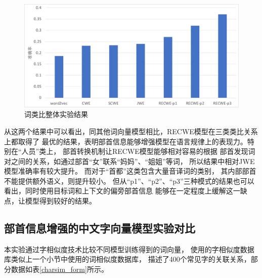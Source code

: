 \begin{figure}[!h]
    \includegraphics[scale=0.5]{picture/word_analogy_result.pdf}
    \caption{词类比整体实验结果}
    \label{word_analogy_all_resutl}
\end{figure}

从这两个结果中可以看出，同其他词向量模型相比，RECWE模型在三类类比关系上都取得了
最优的结果，表明部首信息能够增强模型在语言规律上的表现力。特别在“人员”类上，
部首转换机制让RECWE模型能够相对容易的根据
部首发现词对之间的关系，如通过部首“女”联系“妈妈”、“姐姐”等词，
所以结果中相对JWE模型准确率有较大提升。
而对于“首都”这类包含大量音译词的类别，
其内部部首不能提供额外语义，则提升较小。
但从“p1”、“p2”、“p3”三种模式的结果也可以看出，同时使用目标词和上下文的偏旁部首信息
能够在一定程度上缓解这一缺点，让模型得到较好的结果。

\subsection{部首信息增强的中文字向量模型实验对比}
本实验通过字相似度技术比较不同模型训练得到的词向量，
使用的字相似度数据库类似上一个小节中使用的词相似度数据库，
描述了400个常见字的关联关系，部分数据如表\ref{charsim_form}所示。

